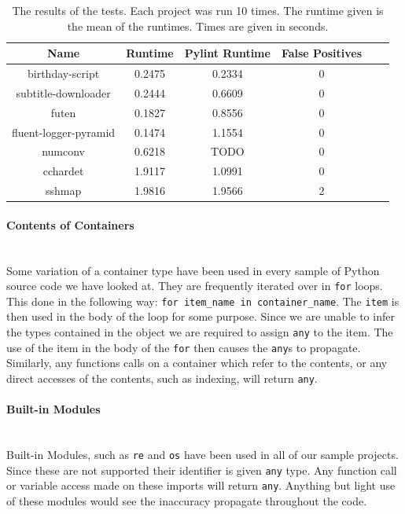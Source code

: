 \documentclass[12pt, titlepage]{article}
\begin{document}
    	\begin{table}
	\centering
    \begin{tabular}{ | c | c | c | c | c | c |}
    \hline
    \textbf{Name} & \textbf{Runtime} & \textbf{Pylint Runtime} & \textbf{False Positives} \\ \hline
    birthday-script & 0.2475 & 0.2334 & 0 \\ \hline
    subtitle-downloader & 0.2444 & 0.6609 & 0 \\ \hline
    futen & 0.1827 & 0.8556 & 0 \\ \hline
    fluent-logger-pyramid & 0.1474 & 1.1554 & 0 \\ \hline
    numconv & 0.6218 & TODO & 0 \\ \hline
    cchardet &  1.9117 & 1.0991 & 0  \\ \hline
    sshmap & 1.9816 & 1.9566 & 2 \\ \hline
    \end{tabular}
    \caption{The results of the tests. Each project was run 10 times. The runtime given is the mean of the runtimes. Times are given in seconds.}
	\label{table:toolResults}
    \end{table}

\paragraph*{Contents of Containers}\mbox{}\\
Some variation of a container type have been used in every sample of Python source code we have looked at. They are frequently iterated over in \texttt{for} loops. This done in the following way: \texttt{for item\_name in container\_name}. The \texttt{item} is then used in the body of the loop for some purpose. Since we are unable to infer the types contained in the object we are required to assign \texttt{any} to the item. The use of the item in the body of the \texttt{for} then causes the \texttt{any}s to propagate. Similarly, any functions calls on a container which refer to the contents, or any direct accesses of the contents, such as indexing, will return \texttt{any}.

\paragraph*{Built-in Modules}\mbox{}\\
Built-in Modules, such as \texttt{re} and \texttt{os} have been used in all of our sample projects. Since these are not supported their identifier is given \texttt{any} type. Any function call or variable access made on these imports will return \texttt{any}. Anything but light use of these modules would see the inaccuracy propagate throughout the code. \\
\end{document}
